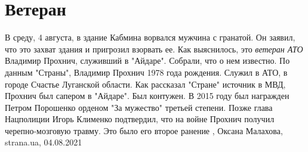  
 
 
 
 
\chapter{Ветеран}
\label{sec:slova.veteran}

В среду, 4 августа, в здание Кабмина ворвался мужчина с гранатой. Он заявил,
что это захват здания и пригрозил взорвать ее. Как выяснилось, это \emph{ветеран АТО}
Владимир Прохнич, служивший в "Айдаре".  Собрали, что о нем известно.  По
данным "Страны", Владимир Прохнич 1978 года рождения. Служил в АТО, в городе
Счастье Луганской области.  Как рассказал "Стране" источник в МВД, Прохнич был сапером в "Айдаре". Был
контужен. В 2015 году был награжден Петром Порошенко орденом "За мужество"
третьей степени.  Позже глава Нацполиции Игорь Клименко подтвердил, что на
войне Прохнич получил черепно-мозговую травму. Это было его второе ранение
, 
Оксана Малахова, strana.ua, 04.08.2021

